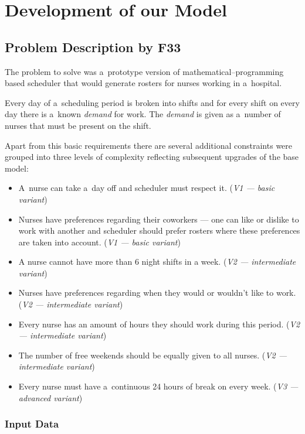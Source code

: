\section{Development of our Model}

\subsection{Problem Description by F33}

The problem to solve was a~prototype version of mathematical--programming based scheduler that would generate rosters for nurses working in a~hospital. 

Every day of a~scheduling period is broken into shifts and for every shift on every day there is a~known \textit{demand} for work. The \textit{demand} is given as a~number of nurses that must be present on the shift.

Apart from this basic requirements there are several additional constraints were grouped into three levels of complexity reflecting subsequent upgrades of the base model:

\begin{itemize}
    \item A~nurse can take a~day off and scheduler must respect it. (\textit{V1 --- basic variant})
    \item Nurses have preferences regarding their coworkers --- one can like or dislike to work with another and scheduler should prefer rosters where these preferences are taken into account. (\textit{V1 --- basic variant})
    \item A nurse cannot have more than 6 night shifts in a week. (\textit{V2 --- intermediate variant})
    \item Nurses have preferences regarding when they would or wouldn't like to work. (\textit{V2 --- intermediate variant})
    \item Every nurse has an amount of hours they should work during this period. (\textit{V2 --- intermediate variant})
    \item The number of free weekends should be equally given to all nurses. (\textit{V2 --- intermediate variant})
    \item Every nurse must have a~continuous 24 hours of break on every week. (\textit{V3 --- advanced variant})
\end{itemize}

\subsubsection{Input Data}

